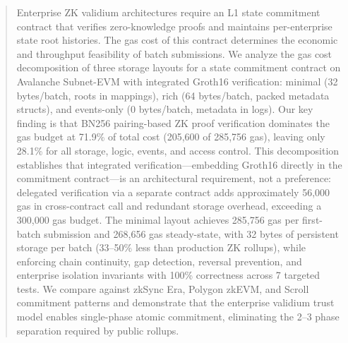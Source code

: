 \begin{abstract}
Enterprise ZK validium architectures require an L1 state commitment contract that verifies
zero-knowledge proofs and maintains per-enterprise state root histories. The gas cost of
this contract determines the economic and throughput feasibility of batch submissions. We
analyze the gas cost decomposition of three storage layouts for a state commitment contract
on Avalanche Subnet-EVM with integrated Groth16 verification: minimal (32 bytes/batch,
roots in mappings), rich (64 bytes/batch, packed metadata structs), and events-only
(0 bytes/batch, metadata in logs). Our key finding is that BN256 pairing-based ZK proof
verification dominates the gas budget at 71.9\% of total cost (205,600 of 285,756 gas),
leaving only 28.1\% for all storage, logic, events, and access control. This decomposition
establishes that integrated verification---embedding Groth16 directly in the commitment
contract---is an architectural requirement, not a preference: delegated verification via a
separate contract adds approximately 56,000 gas in cross-contract call and redundant storage
overhead, exceeding a 300,000 gas budget. The minimal layout achieves 285,756 gas per
first-batch submission and 268,656 gas steady-state, with 32 bytes of persistent storage
per batch (33--50\% less than production ZK rollups), while enforcing chain continuity,
gap detection, reversal prevention, and enterprise isolation invariants with 100\%
correctness across 7 targeted tests. We compare against zkSync Era, Polygon zkEVM, and
Scroll commitment patterns and demonstrate that the enterprise validium trust model enables
single-phase atomic commitment, eliminating the 2--3 phase separation required by public
rollups.
\end{abstract}
